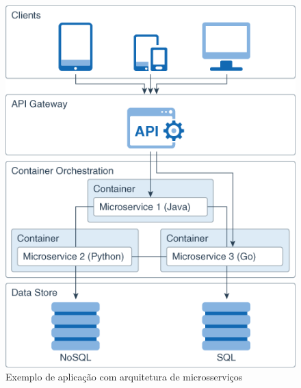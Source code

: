 \begin{figure}[htb]
	\caption{\label{figura_arquitetura_microsservicos}Exemplo de aplicação com arquitetura de microsserviços}
	\begin{center}
	    \includegraphics[scale=0.8]{Imagens/microservice_architecture.png}
	\end{center}
\end{figure}



